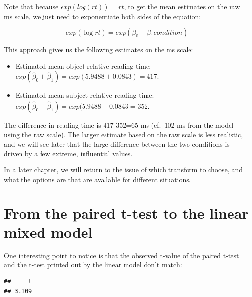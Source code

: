 \documentclass[12pt,]{krantz}
\newenvironment{Shaded}{\begin{snugshade}}{\end{snugshade}}
\newcommand{\DataTypeTok}[1]{\textcolor[rgb]{0.13,0.29,0.53}{#1}}
\newcommand{\KeywordTok}[1]{\textcolor[rgb]{0.13,0.29,0.53}{\textbf{#1}}}
\newcommand{\NormalTok}[1]{#1}
\newcommand{\OperatorTok}[1]{\textcolor[rgb]{0.81,0.36,0.00}{\textbf{#1}}}
\newcommand{\OtherTok}[1]{\textcolor[rgb]{0.56,0.35,0.01}{#1}}
\newcommand{\StringTok}[1]{\textcolor[rgb]{0.31,0.60,0.02}{#1}}
\providecommand{\tightlist}{%
  \setlength{\itemsep}{0pt}\setlength{\parskip}{0pt}}
\begin{document}
Note that because \(exp(log(rt))=rt\), to get the mean estimates on the raw ms scale, we just need to exponentiate both sides of the equation:

\begin{equation}
exp(\log rt) = exp( \beta_0 + \beta_1 condition)
\end{equation}

This approach gives us the following estimates on the ms scale:

\begin{itemize}
\tightlist
\item
  Estimated mean object relative reading time: \(exp(\hat\beta_0+\hat\beta_1)=exp(5.9488+0.0843)=417\).
\item
  Estimated mean subject relative reading time: \(exp(\hat\beta_0-\hat\beta_1)=exp(5.9488-0.0843=352\).
\end{itemize}

The difference in reading time is 417-352=65 ms (cf.~102 ms from the model using the raw scale). The larger estimate based on the raw scale is less realistic, and we will see later that the large difference between the two conditions is driven by a few extreme, influential values.

In a later chapter, we will return to the issue of which transform to choose, and what the options are that are available for different situations.

\hypertarget{from-the-paired-t-test-to-the-linear-mixed-model}{%
\section{From the paired t-test to the linear mixed model}\label{from-the-paired-t-test-to-the-linear-mixed-model}}

One interesting point to notice is that the observed t-value of the paired t-test and the t-test printed out by the linear model don't match:

\begin{Shaded}
\end{Shaded}

\begin{verbatim}
##     t 
## 3.109
\end{verbatim}
\end{document}
